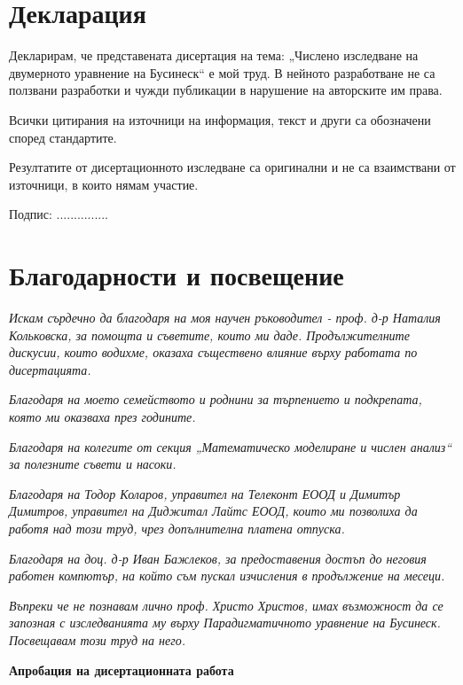 \documentclass[a5paper]{article}
\theoremstyle{remark}
\begin{document}
\begin{large}
\section{Декларация}
Декларирам, че представената дисертация на тема: „Числено изследване на двумерното уравнение на Бусинеск“ е мой труд. В нейното разработване не са ползвани разработки и чужди публикации в нарушение на авторските им права. 

Всички цитирания на източници на информация, текст и други са обозначени според стандартите.

Резултатите от дисертационното изследване са оригинални и не са взаимствани от източници, в които нямам участие.
\vspace{1cm}

Подпис: ...............

\newpage
\section{Благодарности и посвещение}

{\Large \it Искам сърдечно да благодаря на моя научен ръководител - проф. д-р Наталия Кольковска, за помощта и съветите, които ми даде. Продължителните дискусии, които водихме, оказаха съществено влияние върху работата по дисертацията.}

{\Large \it Благодаря на моето семейството и роднини за търпението и подкрепата, която ми оказваха през годините.}

{\Large \it Благодаря на колегите от секция „Математическо моделиране и числен анализ“ за полезните съвети и насоки.}

{\Large \it Благодаря на Тодор Коларов, управител на Телеконт ЕООД и Димитър Димитров, управител на Диджитал Лайтс ЕООД, които ми позволиха да работя над този труд, чрез допълнителна платена отпуска.}

{\Large \it Благодаря на доц. д-р Иван Бажлеков, за предоставения достъп до неговия работен компютър, на който съм пускал изчисления в продължение на месеци.}

\vspace{4cm}

{\Large \it Въпреки че не познавам лично проф. Христо Христов, имах възможност да се запозная с  изследванията му върху Парадигматичното уравнение на Бусинеск. Посвещавам този труд на него. }

\newpage
\noindent\textbf{\Large Апробация на дисертационната работа}
\vspace{0.3cm}


\end{large}
\end{document}
